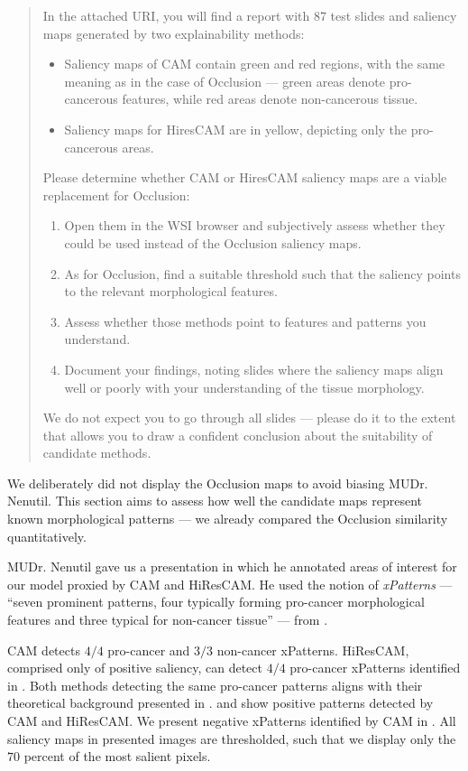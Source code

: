 \begin{doublebar}
\begin{quote}
In the attached URI, you will find a report with 87 test slides and saliency maps generated by two explainability methods:
\begin{itemize}
    \item Saliency maps of CAM contain green and red regions, with the same meaning as in the case of Occlusion --- green areas denote pro-cancerous features, while red areas denote non-cancerous tissue.
    \item Saliency maps for HiresCAM are in yellow, depicting only the pro-cancerous areas.
\end{itemize}
Please determine whether CAM or HiresCAM saliency maps are a viable replacement for Occlusion:
\begin{enumerate}
    \item Open them in the WSI browser and subjectively assess whether they could be used instead of the Occlusion saliency maps.
    \item As for Occlusion, find a suitable threshold such that the saliency points to the relevant morphological features.
    \item Assess whether those methods point to features and patterns you understand.
    \item Document your findings, noting slides where the saliency maps align well or poorly with your understanding of the tissue morphology.
\end{enumerate}
We do not expect you to go through all slides --- please do it to the extent that allows you to draw a confident conclusion about the suitability of candidate methods.
\end{quote}
\end{doublebar}
We deliberately did not display the Occlusion maps to avoid biasing MUDr. Nenutil.
This section aims to assess how well the candidate maps represent known morphological patterns --- we already compared the Occlusion similarity quantitatively.

MUDr. Nenutil gave us a presentation in which he annotated areas of interest for our model proxied by CAM and HiResCAM.
He used the notion of \emph{xPatterns} --- ``seven prominent patterns, four
typically forming pro-cancer morphological features and three typical
for non-cancer tissue'' --- from \cite{gallo}.

CAM detects $4/4$ pro-cancer and $3/3$ non-cancer xPatterns.
HiResCAM, comprised only of positive saliency, can detect $4/4$ pro-cancer xPatterns identified in \cite{gallo}.
Both methods detecting the same pro-cancer patterns aligns with their theoretical background presented in .
 and  show positive patterns detected by CAM and HiResCAM.
We present negative xPatterns identified by CAM in .
All saliency maps in presented images are thresholded, such that we display only the $70$ percent of the most salient pixels.

